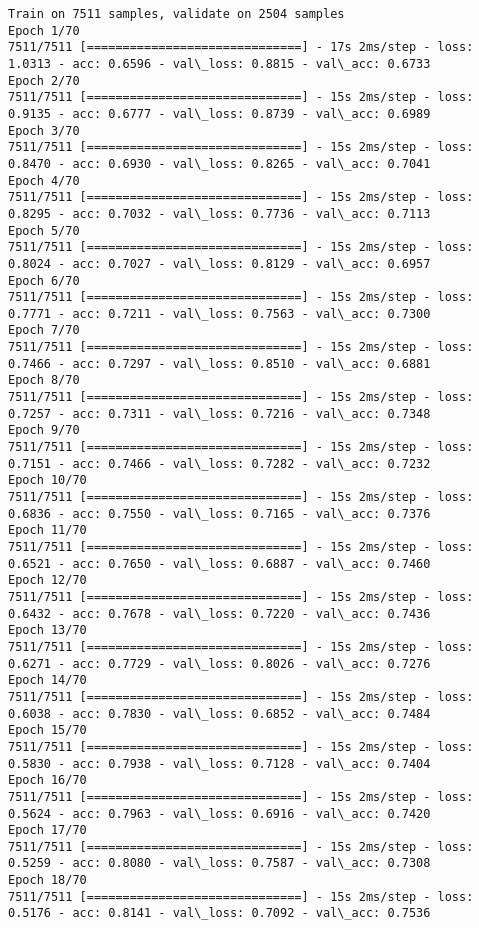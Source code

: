 \documentclass[11pt]{article}
\begin{document}
    \begin{Verbatim}[commandchars=\\\{\}]
Train on 7511 samples, validate on 2504 samples
Epoch 1/70
7511/7511 [==============================] - 17s 2ms/step - loss: 1.0313 - acc: 0.6596 - val\_loss: 0.8815 - val\_acc: 0.6733
Epoch 2/70
7511/7511 [==============================] - 15s 2ms/step - loss: 0.9135 - acc: 0.6777 - val\_loss: 0.8739 - val\_acc: 0.6989
Epoch 3/70
7511/7511 [==============================] - 15s 2ms/step - loss: 0.8470 - acc: 0.6930 - val\_loss: 0.8265 - val\_acc: 0.7041
Epoch 4/70
7511/7511 [==============================] - 15s 2ms/step - loss: 0.8295 - acc: 0.7032 - val\_loss: 0.7736 - val\_acc: 0.7113
Epoch 5/70
7511/7511 [==============================] - 15s 2ms/step - loss: 0.8024 - acc: 0.7027 - val\_loss: 0.8129 - val\_acc: 0.6957
Epoch 6/70
7511/7511 [==============================] - 15s 2ms/step - loss: 0.7771 - acc: 0.7211 - val\_loss: 0.7563 - val\_acc: 0.7300
Epoch 7/70
7511/7511 [==============================] - 15s 2ms/step - loss: 0.7466 - acc: 0.7297 - val\_loss: 0.8510 - val\_acc: 0.6881
Epoch 8/70
7511/7511 [==============================] - 15s 2ms/step - loss: 0.7257 - acc: 0.7311 - val\_loss: 0.7216 - val\_acc: 0.7348
Epoch 9/70
7511/7511 [==============================] - 15s 2ms/step - loss: 0.7151 - acc: 0.7466 - val\_loss: 0.7282 - val\_acc: 0.7232
Epoch 10/70
7511/7511 [==============================] - 15s 2ms/step - loss: 0.6836 - acc: 0.7550 - val\_loss: 0.7165 - val\_acc: 0.7376
Epoch 11/70
7511/7511 [==============================] - 15s 2ms/step - loss: 0.6521 - acc: 0.7650 - val\_loss: 0.6887 - val\_acc: 0.7460
Epoch 12/70
7511/7511 [==============================] - 15s 2ms/step - loss: 0.6432 - acc: 0.7678 - val\_loss: 0.7220 - val\_acc: 0.7436
Epoch 13/70
7511/7511 [==============================] - 15s 2ms/step - loss: 0.6271 - acc: 0.7729 - val\_loss: 0.8026 - val\_acc: 0.7276
Epoch 14/70
7511/7511 [==============================] - 15s 2ms/step - loss: 0.6038 - acc: 0.7830 - val\_loss: 0.6852 - val\_acc: 0.7484
Epoch 15/70
7511/7511 [==============================] - 15s 2ms/step - loss: 0.5830 - acc: 0.7938 - val\_loss: 0.7128 - val\_acc: 0.7404
Epoch 16/70
7511/7511 [==============================] - 15s 2ms/step - loss: 0.5624 - acc: 0.7963 - val\_loss: 0.6916 - val\_acc: 0.7420
Epoch 17/70
7511/7511 [==============================] - 15s 2ms/step - loss: 0.5259 - acc: 0.8080 - val\_loss: 0.7587 - val\_acc: 0.7308
Epoch 18/70
7511/7511 [==============================] - 15s 2ms/step - loss: 0.5176 - acc: 0.8141 - val\_loss: 0.7092 - val\_acc: 0.7536

\end{Verbatim}
\end{document}
